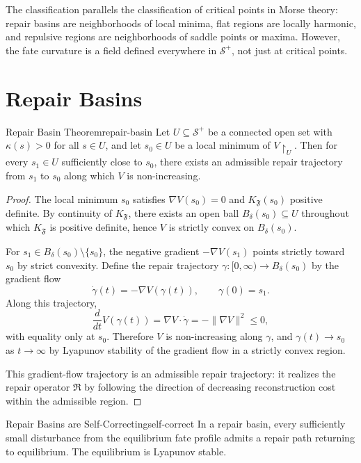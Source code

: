 \documentclass[12pt,twoside,openright]{book}
\newcommand{\repair}{\mathfrak{R}}        %
\newcommand{\fateMap}{\mathfrak{F}}
\newcommand{\fateSpace}{\mathcal{S}}
\providecommand{\fatePos}{\fateSpace^{+}}
\providecommand{\fatePot}{V}
\providecommand{\fateKurv}{K_{\fateMap}}
\providecommand{\fateTraj}{\gamma}
\begin{document}
The classification parallels the classification of critical
points in Morse theory: repair basins are neighborhoods of
local minima, flat regions are locally harmonic, and repulsive
regions are neighborhoods of saddle points or maxima. However,
the fate curvature is a field defined everywhere in $\fatePos$,
not just at critical points.

\section{Repair Basins}

\begin{theorem}{Repair Basin Theorem}{repair-basin}
Let $U\subseteq\fatePos$ be a connected open set with
$\kappa(s)>0$ for all $s\in U$, and let $s_0\in U$ be a
local minimum of $\fatePot\!\restriction_U$. Then for every
$s_1\in U$ sufficiently close to $s_0$, there exists an
admissible repair trajectory from $s_1$ to $s_0$ along which
$\fatePot$ is non-increasing.
\begin{proof}
The local minimum $s_0$ satisfies $\nabla\fatePot(s_0)=0$
and $\fateKurv(s_0)$ positive definite. By continuity of
$\fateKurv$, there exists an open ball $B_\delta(s_0)\subseteq U$
throughout which $\fateKurv$ is positive definite, hence $\fatePot$
is strictly convex on $B_\delta(s_0)$.

For $s_1\in B_\delta(s_0)\setminus\{s_0\}$, the negative
gradient $-\nabla\fatePot(s_1)$ points strictly toward $s_0$
by strict convexity. Define the repair trajectory
$\fateTraj:[0,\infty)\to B_\delta(s_0)$ by the gradient flow
\[
  \dot\fateTraj(t) = -\nabla\fatePot(\fateTraj(t)),
  \qquad
  \fateTraj(0) = s_1.
\]
Along this trajectory,
\[
  \frac{d}{dt}\fatePot(\fateTraj(t))
  = \nabla\fatePot\cdot\dot\fateTraj
  = -\|\nabla\fatePot\|^2 \le 0,
\]
with equality only at $s_0$. Therefore $\fatePot$ is
non-increasing along $\fateTraj$, and $\fateTraj(t)\to s_0$
as $t\to\infty$ by Lyapunov stability of the gradient flow
in a strictly convex region.

This gradient-flow trajectory is an admissible repair trajectory:
it realizes the repair operator $\repair$ by following the
direction of decreasing reconstruction cost within the
admissible region.
\end{proof}
\end{theorem}

\begin{corollary}{Repair Basins are Self-Correcting}{self-correct}
In a repair basin, every sufficiently small disturbance from
the equilibrium fate profile admits a repair path returning to
equilibrium. The equilibrium is Lyapunov stable.
\end{corollary}
\end{document}
